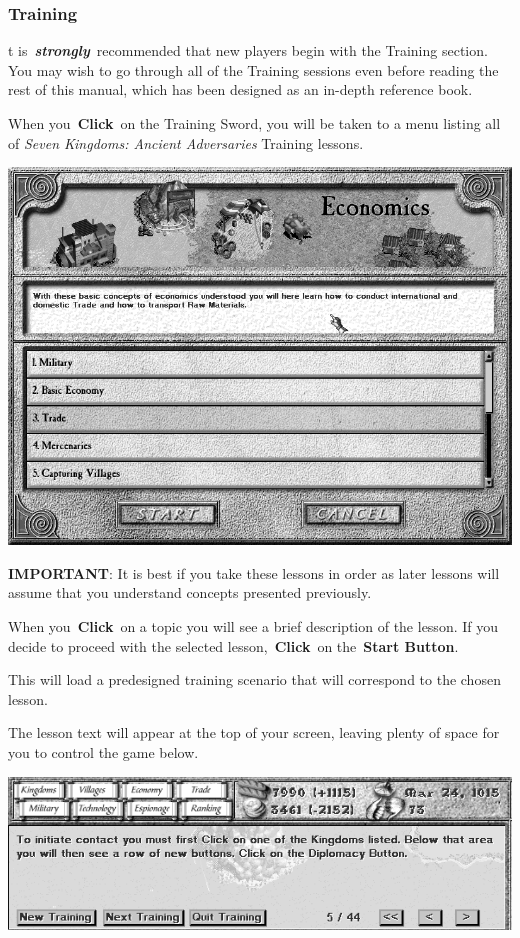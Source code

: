 \subsubsection{Training}

t is \textbf{\textit{strongly}} recommended that new players begin with the Training section. You may wish to go through all of the Training sessions even before reading the rest of this manual, which has been designed as an in-depth reference book.

When you \textbf{Click} on the Training Sword, you will be taken to a menu listing all of \textit{Seven Kingdoms: Ancient Adversaries} Training lessons.

\begin{center}
\includegraphics[width=0.9\linewidth]{Itraining}
\end{center}


\textbf{IMPORTANT}: It is best if you take these lessons in order as later lessons will assume that you understand concepts presented previously.

When you \textbf{Click} on a topic you will see a brief description of the lesson. If you decide to proceed with the selected lesson, \textbf{Click} on the \textbf{Start Button}.

This will load a predesigned training scenario that will correspond to the chosen lesson.

The lesson text will appear at the top of your screen, leaving plenty of space for you to control the game below.

\begin{center}
\includegraphics[width=0.9\linewidth]{Ilesson}
\end{center}

